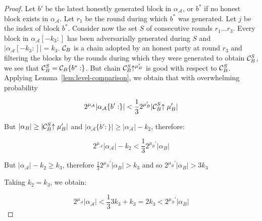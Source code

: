 \begin{proof}
    Let $b'$ be the latest honestly generated block in $\alpha_\mathcal{A}$, or
    $b^*$ if no honest block exists in $\alpha_\mathcal{A}$. Let $r_1$ be the
    round during which $b^*$ was generated. Let $j$ be the index of block $b^*$.
    Consider now the set $S$ of consecutive rounds $r_1 \ldots r_3$. Every block
    in $\alpha_\mathcal{A}[-k_3:]$ has been adversarially generated during $S$
    and $|\alpha_\mathcal{A}[-k_3:]| = k_3$. $\mathcal{C}_B$ is a chain adopted by an
    honest party at round $r_3$ and filtering the blocks by the rounds during
    which they were generated to obtain $\mathcal{C}_B^S$, we see that $\mathcal{C}_B^S =
    \mathcal{C}_B\{b^*:\}$. But chain $\mathcal{C}_B^S\negthickspace\uparrow^{\mu_B'}$ is good with
    respect to $\mathcal{C}_B^S$. Applying Lemma~\ref{lem:level-comparison}, we
    obtain that with overwhelming probability

    \begin{equation*}
    2^{\mu_\mathcal{A}}|\alpha_\mathcal{A}\{b':\}| <
    \frac{1}{3}2^{\mu_B'}|\mathcal{C}_B^S\negthickspace\uparrow{\mu_B'}|
    \end{equation*}

    But $|\alpha_B| \geq |\mathcal{C}_B^S\negthickspace\uparrow{\mu_B'}|$ and
    $|\alpha_\mathcal{A}\{b':\}| \geq |\alpha_\mathcal{A}| - k_2$, therefore:

    \begin{equation*}
    2^{\mu_\mathcal{A}}|\alpha_\mathcal{A}| - k_2 <
    \frac{1}{3}2^{\mu_B'}|\alpha_B|
    \end{equation*}

    But $|\alpha_\mathcal{A}| - k_2 \geq k_3$, therefore
    $\frac{1}{3}2^{\mu_B'}|\alpha_B| > k_3$ and so $2^{\mu_B'}|\alpha_B| > 3k_3$

    Taking $k_2 = k_3$, we obtain:

    \begin{equation*}
    2^{\mu_\mathcal{A}}|\alpha_\mathcal{A}| <
    \frac{1}{3}3k_3 + k_3 = 2k_3 < 2^{\mu_B'}|\alpha_B|
    \end{equation*}


\end{proof}
